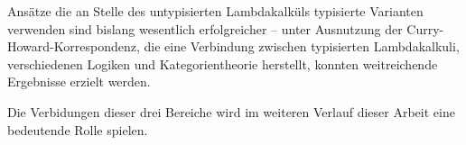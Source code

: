 Ansätze die an Stelle des untypisierten Lambdakalküls typisierte Varianten
verwenden sind bislang wesentlich erfolgreicher -- 
unter Ausnutzung der Curry-Howard-Korrespondenz, 
die eine Verbindung zwischen typisierten Lambdakalkuli, verschiedenen Logiken
und Kategorientheorie herstellt, 
konnten weitreichende Ergebnisse erzielt werden.

Die Verbidungen dieser drei Bereiche wird im weiteren Verlauf dieser Arbeit
eine bedeutende Rolle spielen.





